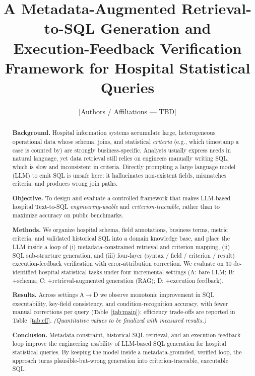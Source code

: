 \documentclass[11pt]{article}
\title{A Metadata-Augmented Retrieval-to-SQL Generation and\\
Execution-Feedback Verification Framework for Hospital Statistical Queries}
\author{[Authors / Affiliations --- TBD]}
\date{}
\begin{document}
\maketitle

\begin{abstract}
\noindent\textbf{Background.} Hospital information systems accumulate large, heterogeneous
operational data whose schema, joins, and statistical \emph{criteria} (e.g., which timestamp a
case is counted by) are strongly business-specific. Analysts usually express needs in natural
language, yet data retrieval still relies on engineers manually writing SQL, which is slow and
inconsistent in criteria. Directly prompting a large language model (LLM) to emit SQL is unsafe
here: it hallucinates non-existent fields, mismatches criteria, and produces wrong join paths.

\noindent\textbf{Objective.} To design and evaluate a controlled framework that makes LLM-based
hospital Text-to-SQL \emph{engineering-usable} and \emph{criterion-traceable}, rather than to
maximize accuracy on public benchmarks.

\noindent\textbf{Methods.} We organize hospital schema, field annotations, business terms, metric
criteria, and validated historical SQL into a domain knowledge base, and place the LLM inside a
loop of (i) metadata-constrained retrieval and criterion mapping, (ii) SQL sub-structure
generation, and (iii) four-layer (syntax / field / criterion / result) execution-feedback
verification with error-attribution correction. We evaluate on 30 de-identified hospital
statistical tasks under four incremental settings (A: bare LLM; B: +schema; C: +retrieval-augmented
generation (RAG); D: +execution feedback).

\noindent\textbf{Results.} Across settings A$\rightarrow$D we observe monotonic improvement in SQL
executability, key-field consistency, and condition-recognition accuracy, with fewer manual
corrections per query (Table~\ref{tab:main}); efficiency trade-offs are reported in
Table~\ref{tab:eff}. \emph{(Quantitative values to be finalized with measured results.)}

\noindent\textbf{Conclusion.} Metadata constraint, historical-SQL retrieval, and an
execution-feedback loop improve the engineering usability of LLM-based SQL generation for hospital
statistical queries. By keeping the model inside a metadata-grounded, verified loop, the approach
turns plausible-but-wrong generation into criterion-traceable, executable SQL.
\end{abstract}
\end{document}
